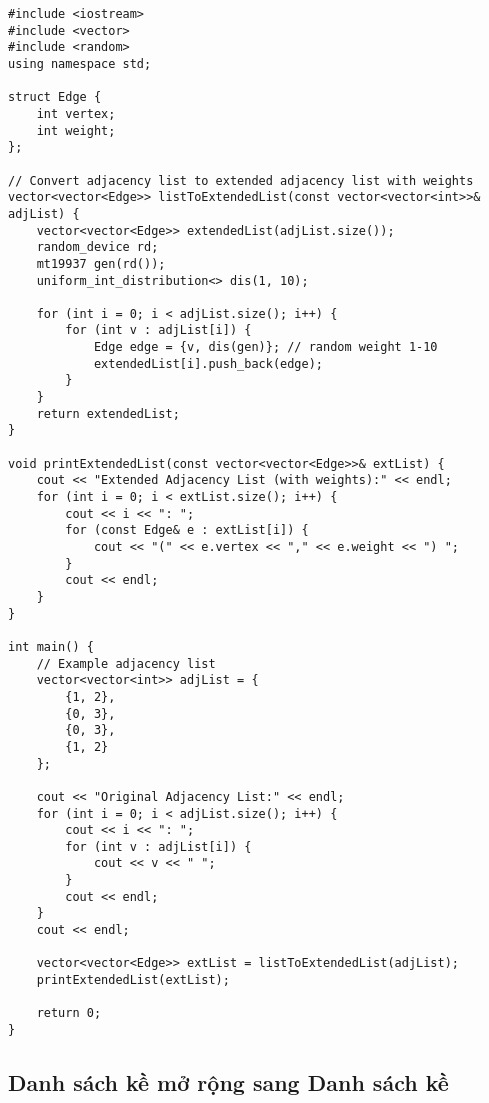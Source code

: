 \documentclass[12pt]{article}
\begin{document}
\begin{lstlisting}[caption={Chuyển đổi từ Danh sách kề sang Danh sách kề mở rộng (có trọng số)}]
#include <iostream>
#include <vector>
#include <random>
using namespace std;

struct Edge {
    int vertex;
    int weight;
};

// Convert adjacency list to extended adjacency list with weights
vector<vector<Edge>> listToExtendedList(const vector<vector<int>>& adjList) {
    vector<vector<Edge>> extendedList(adjList.size());
    random_device rd;
    mt19937 gen(rd());
    uniform_int_distribution<> dis(1, 10);
    
    for (int i = 0; i < adjList.size(); i++) {
        for (int v : adjList[i]) {
            Edge edge = {v, dis(gen)}; // random weight 1-10
            extendedList[i].push_back(edge);
        }
    }
    return extendedList;
}

void printExtendedList(const vector<vector<Edge>>& extList) {
    cout << "Extended Adjacency List (with weights):" << endl;
    for (int i = 0; i < extList.size(); i++) {
        cout << i << ": ";
        for (const Edge& e : extList[i]) {
            cout << "(" << e.vertex << "," << e.weight << ") ";
        }
        cout << endl;
    }
}

int main() {
    // Example adjacency list
    vector<vector<int>> adjList = {
        {1, 2},
        {0, 3},
        {0, 3},
        {1, 2}
    };
    
    cout << "Original Adjacency List:" << endl;
    for (int i = 0; i < adjList.size(); i++) {
        cout << i << ": ";
        for (int v : adjList[i]) {
            cout << v << " ";
        }
        cout << endl;
    }
    cout << endl;
    
    vector<vector<Edge>> extList = listToExtendedList(adjList);
    printExtendedList(extList);
    
    return 0;
}
\end{lstlisting}

\subsection{Danh sách kề mở rộng sang Danh sách kề}
\end{document}
